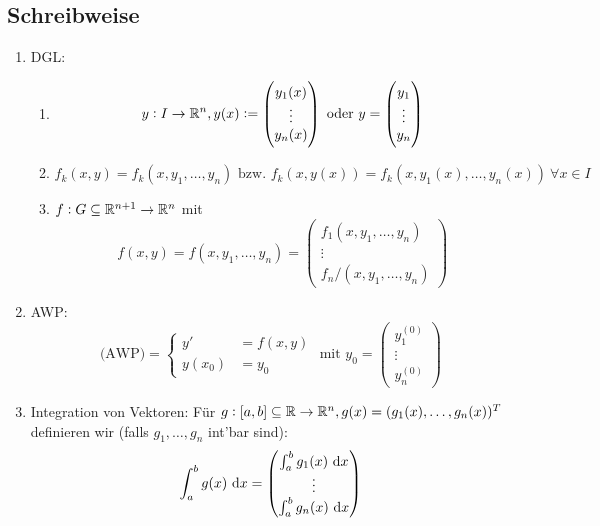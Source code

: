 \subsection{Schreibweise}
\begin{enumerate}[label= (\alph*)]
	\item DGL:
		\begin{enumerate}
			\item 
				\begin{equation*}
					y: I \to \mathbb{R}^n, y(x) := \begin{pmatrix}
						y_1(x) \\ \vdots \\ y_n(x)
					\end{pmatrix} \text{ oder }
					y = \begin{pmatrix}
						y_1 \\ \vdots \\ y_n
					\end{pmatrix}
				\end{equation*}
			\item
				\begin{equation*}
					f_k(x,y) = f_k(x, y_1, \ldots, y_n) \text{ bzw. }
					f_k(x,y(x)) = f_k(x, y_1(x), \ldots, y_n(x))\ \forall x \in I
				\end{equation*}			
			\item $f: G \subseteq \mathbb{R}^{n+1} \to \mathbb{R}^n$ mit
				\begin{equation*}
					f(x,y) = f(x, y_1, \ldots, y_n) = \begin{pmatrix}
						f_1(x, y_1, \ldots, y_n) \\
						\vdots \\
						f_n/(x, y_1, \ldots, y_n)
					\end{pmatrix}
				\end{equation*}
		\end{enumerate}
	\item AWP:
		\begin{equation*}
			\text{(AWP)} = \begin{cases}
				y' &= f(x,y) \\
				y(x_0) &= y_0
			\end{cases} \text{ mit }
			y_0 = \begin{pmatrix}
				y_1^{(0)} \\ \vdots \\ y_n^{(0)}
			\end{pmatrix}
		\end{equation*}
	\item Integration von Vektoren:
		Für $g:[a,b] \subseteq \mathbb{R} \rightarrow \mathbb{R}^n, g(x) = (g_1(x), \ldots, g_n(x))^T$ definieren wir (falls $g_1, \ldots, g_n$ int'bar sind):
		\begin{equation*}
		 \int_a^b g(x) \text{ d}x = \begin{pmatrix}
		 		\int_a^b g_1(x) \text{ d}x \\
		 		\vdots \\
		 		\int_a^b g_n(x) \text{ d}x \\
		 	\end{pmatrix}
		\end{equation*}
\end{enumerate}


